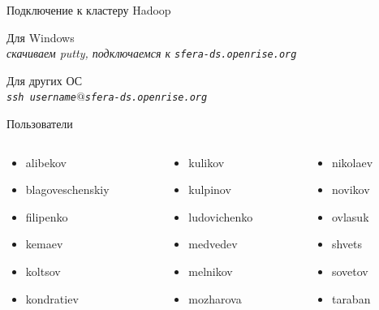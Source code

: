 \documentclass[10pt,a4paper]{beamer}
\begin{document}

\begin{frame}[fragile]{Подключение к кластеру Hadoop}

Для Windows \\ {\it скачиваем putty, подключаемся к \texttt{sfera-ds.openrise.org}}

\vspace{1em}
Для других ОС \\ {\it \texttt{ssh username$@$sfera-ds.openrise.org}}

\vspace{1em}
Пользователи
\begin{columns}[T]
    \begin{column}{.3\textwidth} 
	\begin{itemize}
\item alibekov
\item blagoveschenskiy
\item filipenko
\item kemaev
\item koltsov
\item kondratiev
\end{itemize}
    \end{column}
    \begin{column}{.3\textwidth} 
\begin{itemize}
\item kulikov
\item kulpinov
\item ludovichenko
\item medvedev
\item melnikov
\item mozharova
\end{itemize}    
    \end{column}
    \begin{column}{.3\textwidth} 
\begin{itemize}
\item nikolaev
\item novikov
\item ovlasuk
\item shvets
\item sovetov
\item taraban
\end{itemize}    
    \end{column}
\end{columns}

\end{frame}
\end{document}
